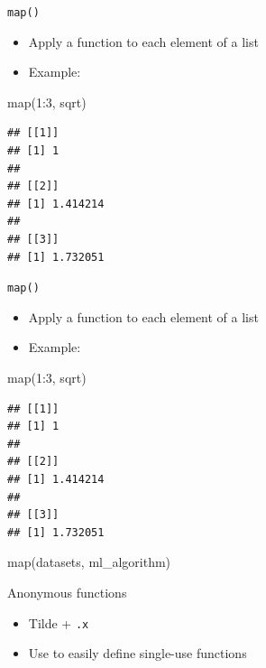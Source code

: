 \documentclass[
  ignorenonframetext,
]{beamer}
\newenvironment{Shaded}{\begin{snugshade}}{\end{snugshade}}
\newcommand{\DecValTok}[1]{\textcolor[rgb]{0.00,0.00,0.81}{#1}}
\newcommand{\FunctionTok}[1]{\textcolor[rgb]{0.00,0.00,0.00}{#1}}
\newcommand{\NormalTok}[1]{#1}
\newcommand{\SpecialCharTok}[1]{\textcolor[rgb]{0.00,0.00,0.00}{#1}}
\providecommand{\tightlist}{%
  \setlength{\itemsep}{0pt}\setlength{\parskip}{0pt}}
\begin{document}
\begin{frame}[fragile]{\texttt{map()}}
\protect\hypertarget{map}{}
\begin{itemize}
\tightlist
\item
  Apply a function to each element of a list
\item
  Example:
\end{itemize}

\begin{Shaded}
\begin{Highlighting}[]
\FunctionTok{map}\NormalTok{(}\DecValTok{1}\SpecialCharTok{:}\DecValTok{3}\NormalTok{, sqrt)}
\end{Highlighting}
\end{Shaded}

\begin{verbatim}
## [[1]]
## [1] 1
## 
## [[2]]
## [1] 1.414214
## 
## [[3]]
## [1] 1.732051
\end{verbatim}
\end{frame}

\begin{frame}[fragile]{\texttt{map()}}
\protect\hypertarget{map-1}{}
\begin{itemize}
\tightlist
\item
  Apply a function to each element of a list
\item
  Example:
\end{itemize}

\begin{Shaded}
\begin{Highlighting}[]
\FunctionTok{map}\NormalTok{(}\DecValTok{1}\SpecialCharTok{:}\DecValTok{3}\NormalTok{, sqrt)}
\end{Highlighting}
\end{Shaded}

\begin{verbatim}
## [[1]]
## [1] 1
## 
## [[2]]
## [1] 1.414214
## 
## [[3]]
## [1] 1.732051
\end{verbatim}

\begin{Shaded}
\begin{Highlighting}[]
\FunctionTok{map}\NormalTok{(datasets, ml\_algorithm)}
\end{Highlighting}
\end{Shaded}
\end{frame}

\begin{frame}[fragile]{Anonymous functions}
\protect\hypertarget{anonymous-functions}{}
\begin{itemize}
\tightlist
\item
  Tilde + \texttt{.x}
\item
  Use to easily define single-use functions
\end{itemize}
\end{frame}
\end{document}
